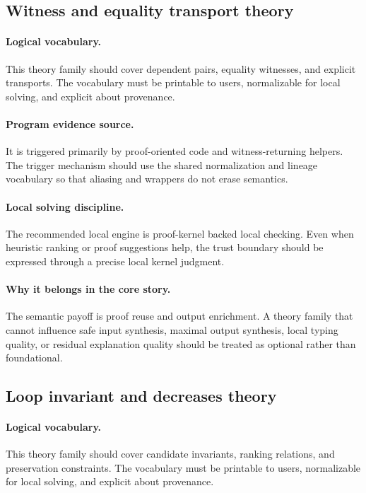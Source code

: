 \documentclass[11pt]{report}
\theoremstyle{definition}
\theoremstyle{plain}
\begin{document}
\subsection{Witness and equality transport theory}

\paragraph{Logical vocabulary.}
This theory family should cover dependent pairs, equality witnesses, and explicit transports. The vocabulary must be printable to
users, normalizable for local solving, and explicit about provenance.

\paragraph{Program evidence source.}
It is triggered primarily by proof-oriented code and witness-returning helpers. The trigger mechanism should use the
shared normalization and lineage vocabulary so that aliasing and wrappers do
not erase semantics.

\paragraph{Local solving discipline.}
The recommended local engine is proof-kernel backed local checking. Even when heuristic ranking or
proof suggestions help, the trust boundary should be expressed through a
precise local kernel judgment.

\paragraph{Why it belongs in the core story.}
The semantic payoff is proof reuse and output enrichment. A theory family that cannot influence safe
input synthesis, maximal output synthesis, local typing quality, or residual
explanation quality should be treated as optional rather than foundational.

\subsection{Loop invariant and decreases theory}

\paragraph{Logical vocabulary.}
This theory family should cover candidate invariants, ranking relations, and preservation constraints. The vocabulary must be printable to
users, normalizable for local solving, and explicit about provenance.
\end{document}
